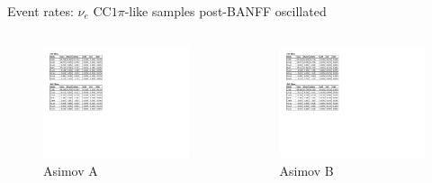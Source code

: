 \documentclass{beamer}
\begin{document}
\begin{frame}{Event rates: $\nu_e\text{ CC}1\pi$-like samples post-BANFF oscillated}
	\centering
	\begin{columns}
		\begin{column}{0.5\paperwidth}
			\begin{figure}
				\includegraphics[page=3, trim={0cm 15cm 13cm 1cm}, clip, scale=0.52] {images/rates/postfit_A}
				\caption*{Asimov A}
			\end{figure}
		\end{column}
		\begin{column}{0.5\paperwidth}
			\begin{figure}
				\includegraphics[page=3, trim={0cm 15cm 13cm 1cm}, clip, scale=0.52] {images/rates/postfit_A}
				\caption*{Asimov B}
			\end{figure}
		\end{column}
	\end{columns}
\end{frame}
\end{document}
